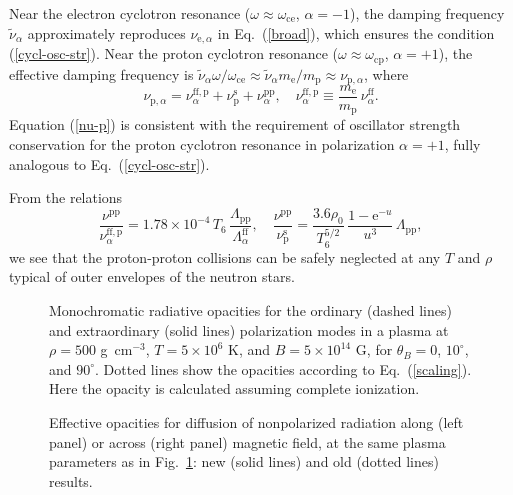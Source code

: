 \documentclass{emulateapj}
\newcommand{\gcc}{\mbox{g cm$^{-3}$}}
\newcommand{\beq}{\begin{equation}}
\newcommand{\eeq}{\end{equation}}
\newcommand{\req}[1]{Eq.\ (\ref{#1})}
\newcommand{\mel}{m_\mathrm{e}}
\newcommand{\mpr}{m_\mathrm{p}}
\newcommand{\omc}{\omega_\mathrm{ce}}
\newcommand{\omp}{\omega_\mathrm{cp}}
\begin{document}
Near the electron cyclotron resonance ($\omega\approx\omc$,
$\alpha=-1$), the damping frequency $\tilde\nu_\alpha$ approximately reproduces 
$\nu_{\mathrm{e},\alpha}$ in \req{broad}, which ensures the condition
(\ref{cycl-osc-str}). Near the proton cyclotron resonance ($\omega\approx\omp$,
$\alpha=+1$), the effective damping frequency is
$\tilde\nu_\alpha \omega/\omc\approx \tilde\nu_\alpha\mel/\mpr
\approx\nu_{\mathrm{p},\alpha}$,
where
\beq
   \nu_{\mathrm{p},\alpha} = \nu_\alpha^\mathrm{ff,p}
   + \nu_\mathrm{p}^\mathrm{s} + \nu_\alpha^\mathrm{pp},
\quad
  \nu_\alpha^\mathrm{ff,p} \equiv
   \frac{\mel}{\mpr}\,\nu_\alpha^\mathrm{ff}.
\label{nu-p}
\eeq
Equation (\ref{nu-p}) is consistent with
the requirement of oscillator strength conservation for
the proton cyclotron resonance in polarization $\alpha=+1$,
fully analogous to \req{cycl-osc-str}. 

From the relations
\beq
   \frac{\nu^\mathrm{pp}}{\nu_\alpha^\mathrm{ff,p}}
    = 1.78\times10^{-4}\,T_6 
    \,\frac{\Lambda_\mathrm{pp}}{\Lambda_\alpha^\mathrm{ff}},
\quad
   \frac{\nu^\mathrm{pp}}{\nu_\mathrm{p}^\mathrm{s}} = 
   \frac{3.6\rho_0}{T_6^{5/2}}\,\frac{1-\mathrm{e}^{-u}}{u^3}
   \,\Lambda_\mathrm{pp},
\eeq
we see that the proton-proton collisions can be safely neglected
at any $T$ and $\rho$ typical of outer envelopes of the neutron stars.

\begin{figure}
\caption{Monochromatic radiative opacities
for the ordinary (dashed lines) and extraordinary (solid lines)
polarization modes in a plasma at $\rho=500$ \gcc,
$T=5\times10^6$ K, and $B=5\times10^{14}$ G,
for $\theta_B=0$, $10^\circ$, and $90^\circ$.
Dotted lines show the opacities according to \protect\req{scaling}.
Here the opacity is calculated assuming complete ionization.
\label{fig-ang14_7}}
\end{figure}

\begin{figure}
\caption{Effective opacities for diffusion
of nonpolarized radiation along (left panel) or across (right panel)
magnetic field, at the same plasma parameters as in 
Fig.\ \protect\ref{fig-ang14_7}:
new (solid lines) and old (dotted lines) results.
\label{fig-opm14_7}}
\end{figure}
\end{document}
